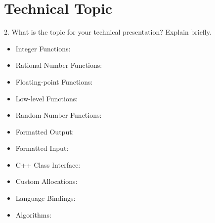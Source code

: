 \section{Technical Topic}

2. What is the topic for your technical presentation? Explain briefly.

\begin{itemize}

  \item Integer Functions:
  \item Rational Number Functions:
  \item Floating-point Functions:
  \item Low-level Functions:
  \item Random Number Functions:
  \item Formatted Output:
  \item Formatted Input:
  \item C++ Class Interface:
  \item Custom Allocations:
  \item Language Bindings:
  \item Algorithms:



\end{itemize}

